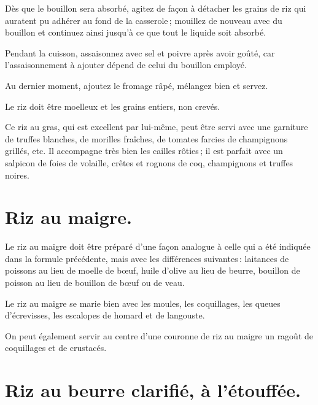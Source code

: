 Dès que le bouillon sera absorbé, agitez de façon à détacher les grains de riz
qui auratent pu adhérer au fond de la casserole ; mouillez de nouveau avec du
bouillon et continuez ainsi jusqu'à ce que tout le liquide soit absorbé.

Pendant la cuisson, assaisonnez avec sel et poivre après avoir goûté, car
l'assaisonnement à ajouter dépend de celui du bouillon employé.

Au dernier moment, ajoutez le fromage râpé, mélangez bien et servez.

Le riz doit être moelleux et les grains entiers, non crevés.

\sk

Ce riz au gras, qui est excellent par lui-même, peut être servi avec une
garniture de truffes blanches, de morilles fraîches, de tomates farcies de
champignons grillés, etc. Il accompagne très bien les cailles rôties ; il est
parfait avec un salpicon de foies de volaille, crêtes et rognons de coq,
champignons et truffes noires.

\section*{\centering Riz au maigre.}
{}

Le riz au maigre doit être préparé d'une façon analogue à celle qui a été
indiquée dans la formule précédente, mais avec les différences suivantes :
laitances de poissons au lieu de moelle de bœuf, huile d'olive au lieu de
beurre, bouillon de poisson au lieu de bouillon de bœuf ou de veau.

\sk

Le riz au maigre se marie bien avec les moules, les coquillages, les queues
d'écrevisses, les escalopes de homard et de langouste.

\medskip

On peut également servir au centre d'une couronne de riz au maigre un
ragoût de coquillages et de crustacés.

\section*{\centering Riz au beurre clarifié, à l'étouffée.}
{}

